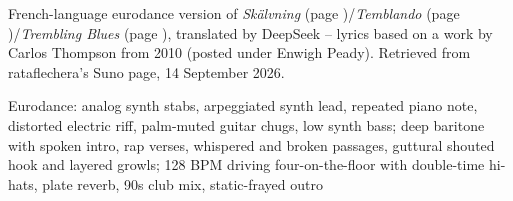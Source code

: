 
\begin{notes}
French-language eurodance version of \emph{Skälvning} (page \pageref{sec:skalvning})/\emph{Temblando} (page \pageref{sec:temblando})/\emph{Trembling Blues} (page \pageref{sec:trembling-blues}), translated by DeepSeek -- lyrics based on a work by Carlos Thompson from 2010 (posted under Enwigh Peady). Retrieved from rataflechera's Suno page, 14 September 2026.
\end{notes}
\begin{style}
Eurodance: analog synth stabs, arpeggiated synth lead, repeated piano note, distorted electric riff, palm-muted guitar chugs, low synth bass; deep baritone with spoken intro, rap verses, whispered and broken passages, guttural shouted hook and layered growls; 128 BPM driving four-on-the-floor with double-time hi-hats, plate reverb, 90s club mix, static-frayed outro
\end{style}
